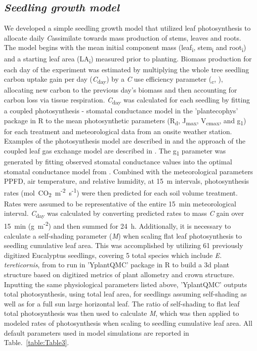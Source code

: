 \documentclass[a4paper]{article}\usepackage[]{graphicx}\usepackage[]{color}
\begin{document}
\subsection*{\textit{Seedling growth model}}
We developed a simple seedling growth model that utilized leaf photosynthesis to allocate daily \textit{C}assimilate towards mass production of stems, leaves and roots. The model begins with the mean initial component mass (leaf\textsubscript{i}, stem\textsubscript{i} and root\textsubscript{i}) and a starting leaf area (LA\textsubscript{i}) measured prior to planting. Biomass production for each day of the experiment was estimated by multiplying the whole tree seedling carbon uptake gain per day (\textit{C}\textsubscript{day}) by a \textit{C} use efficiency parameter (\textUpsilon\textsubscript{c}, \citet{makela1997carbon}), allocating new carbon to the previous day’s biomass and then accounting for carbon loss via tissue respiration. \textit{C}\textsubscript{day} was calculated for each seedling by fitting a coupled photosynthesis - stomatal conductance model \citep{farquhar1980biochemical,medlyn2011reconciling} in the 'plantecophys' package in R \citep{Duursma2014} to the mean photosynthetic parameters (R\textsubscript{d}, J\textsubscript{max}, V\textsubscript{cmax}, and g\textsubscript{1}) for each treatment and meteorological data from an onsite weather station.  Examples of the photosynthesis model are described in \citet{medlyn2002temperature} and the approach of the coupled leaf gas exchange model are described in \citet{duursma2014peaked}. The g\textsubscript{1} parameter was generated by fitting observed stomatal conductance values into the optimal stomatal conductance model from \citep{medlyn2012reconciling}. Combined with the meteorological parameters PPFD, air temperature, and relative humidity, at 15~m intervals, photosynthesis rates ({\textmugreek}mol~CO\textsubscript{2}~m\textsuperscript{-2}~s\textsuperscript{-1}) were then predicted for each soil volume treatment. Rates were assumed to be representative of the entire 15~min meteorological interval. \textit{C}\textsubscript{day} was calculated by converting predicted rates to mass \textit{C} gain over 15~min (g~m\textsuperscript{-2}) and then summed for 24~h. Additionally, it is necessary to calculate a self-shading parameter (\textit{M}) when scaling flat leaf photosynthesis to seedling cumulative leaf area. This was accomplished by utilizing 61 previously digitized Eucalyptus seedlings, covering 5 total species which include \textit{E. tereticornis}, from \citet{duursma2012light} to run in 'YplantQMC' package in R \citep{YplantQMC} to build a 3d plant structure based on digitized metrics of plant allometry and crown structure. Inputting the same physiological parameters listed above, 'YplantQMC' outputs total photosynthesis, using total leaf area, for seedlings assuming self-shading as well as for a full sun large horizontal leaf.  The ratio of self-shading to flat leaf total photosynthesis was then used to calculate \textit{M}, which was then applied to modeled rates of photosynthesis when scaling to seedling cumulative leaf area. All default parameters used in model simulations are reported in Table.~\ref{table:Table3}.
\end{document}
